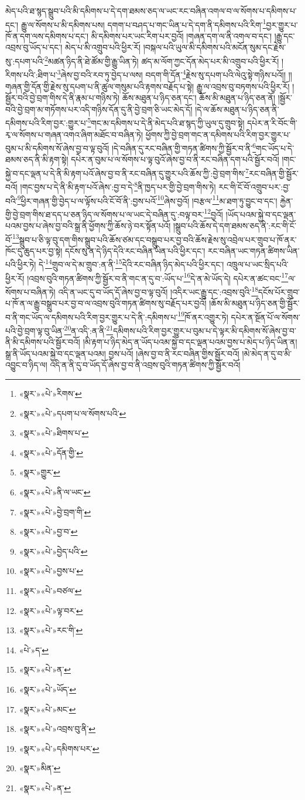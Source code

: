 མེད་པའི་ཐ་སྙད་སྒྲུབ་པའི་མི་དམིགས་པ་དེ་དག་ཐམས་ཅད་ལ་ཡང་རང་བཞིན་འགལ་བ་ལ་སོགས་པ་དམིགས་པ་དང་། རྒྱུ་ལ་སོགས་པ་མི་དམིགས་པས། དགག་པ་བཤད་པ་གང་ཡིན་པ་དེ་དག་ནི་དམིགས་པའི་རིག་\footnote{«སྣར་»«པེ་»རིགས་}བྱར་གྱུར་པ་ཁོ་ན་དག་ལས་དམིགས་པ་དང་། མི་དམིགས་པར་ཡང་རིག་པར་བྱའོ། །གཞན་དག་ལ་ནི་འགལ་བ་དང་། །རྒྱུ་དང་འབྲས་བུ་ཡོད་པ་དང་། མེད་པ་མི་འགྲུབ་པའི་ཕྱིར་རོ། །བསྐལ་པའི་ཡུལ་མི་དམིགས་པའི་མངོན་སུམ་དང་རྗེས་སུ་:དཔག་པའི་\footnote{«སྣར་»«པེ་»དཔག་པ་ལ་སོགས་པའི་}མཚན་ཉིད་ནི་ཐེ་ཚོམ་གྱི་རྒྱུ་ཡིན་ཏེ། ཚད་མ་ལོག་ཀྱང་དོན་མེད་པར་མི་འགྲུབ་པའི་ཕྱིར་རོ། །རིགས་པའི་:ཐིག་པ་\footnote{«སྣར་»«པེ་»ཐིགས་པ་}ཞེས་བྱ་བའི་རབ་ཏུ་བྱེད་པ་ལས། བདག་གི་དོན་\footnote{«སྣར་»«པེ་»དོན་གྱི་}རྗེས་སུ་དཔག་པའི་ལེའུ་སྟེ་གཉིས་པའོ།། །།གཞན་གྱི་དོན་གྱི་རྗེས་སུ་དཔག་པ་ནི་ཚུལ་གསུམ་པའི་རྟགས་བརྗོད་པ་སྟེ། རྒྱུ་ལ་འབྲས་བུ་བཏགས་པའི་ཕྱིར་རོ། །སྦྱོར་བའི་བྱེ་བྲག་གིས་དེ་ནི་རྣམ་པ་གཉིས་ཏེ། ཆོས་མཐུན་པ་ཉིད་ཅན་དང་། ཆོས་མི་མཐུན་པ་ཉིད་ཅན་ནོ། །སྦྱོར་བའི་བྱེ་བྲག་མ་གཏོགས་པར་འདི་གཉིས་དོན་དུ་ནི་བྱེ་བྲག་ཅི་ཡང་མེད་དོ། །དེ་ལ་ཆོས་མཐུན་པ་ཉིད་ཅན་ནི་དམིགས་པའི་རིག་བྱར་:གྱུར་པ་\footnote{«སྣར་»གྱུར་}གང་མ་དམིགས་པ་དེ་ནི་མེད་པའི་ཐ་སྙད་ཀྱི་ཡུལ་དུ་གྲུབ་སྟེ། དཔེར་ན་རི་བོང་གི་རྭ་ལ་སོགས་པ་གཞན་འགའ་ཞིག་མཐོང་བ་བཞིན་ཏེ། ཕྱོགས་ཀྱི་བྱེ་བྲག་གང་ན་དམིགས་པའི་རིག་བྱར་གྱུར་པ་བུམ་པ་མི་དམིགས་སོ་ཞེས་བྱ་བ་ལྟ་བུའོ། །དེ་བཞིན་དུ་རང་བཞིན་གྱི་གཏན་ཚིགས་ཀྱི་སྦྱོར་བ་ནི་\footnote{«སྣར་»«པེ་»ནི་ལ་ཡང་}གང་ཡོད་པ་དེ་ཐམས་ཅད་ནི་མི་རྟག་སྟེ། དཔེར་ན་བུམ་པ་ལ་སོགས་པ་ལྟ་བུའོ་ཞེས་བྱ་བ་ནི་རང་བཞིན་དག་པའི་སྦྱོར་བའོ། །གང་སྐྱེ་བ་དང་ལྡན་པ་དེ་ནི་མི་རྟག་པའོ་ཞེས་བྱ་བ་ནི་རང་བཞིན་དུ་གྱུར་པའི་ཆོས་ཀྱི་:བྱེ་བྲག་གིས་\footnote{«སྣར་»«པེ་»བྱེ་བྲག་གི་}རང་བཞིན་གྱི་སྦྱོར་བའོ། །གང་བྱས་པ་དེ་ནི་མི་རྟག་པའོ་ཞེས་:བྱ་བ་དེ་\footnote{«སྣར་»«པེ་»བྱ་བ་}ནི་ཁྱད་པར་གྱི་བྱེ་བྲག་གིས་ཏེ། རང་གི་ངོ་བོ་འགྲུབ་པར་:བྱ་བའི་\footnote{«སྣར་»«པེ་»བྱེད་པའི་}ཕྱིར་གཞན་གྱི་བྱེད་པ་ལ་ལྟོས་པའི་ངོ་བོ་ནི་:བྱས་པའོ་\footnote{«སྣར་»«པེ་»བྱས་པ་}ཞེས་བྱའོ། །བརྩལ་\footnote{«སྣར་»«པེ་»བཙལ་}མ་ཐག་ཏུ་བྱུང་བ་དང་། རྐྱེན་གྱི་བྱེ་བྲག་གིས་ཐ་དད་པ་ཅན་ཉིད་ལ་སོགས་པ་ལ་ཡང་དེ་བཞིན་དུ་:བལྟ་བར་\footnote{«སྣར་»«པེ་»ལྟ་བར་}བྱའོ། །ཡོད་པའམ་སྐྱེ་བ་དང་ལྡན་པའམ་བྱས་པ་ཞེས་བྱ་བའི་སྒྲ་ནི་ཕྱོགས་ཀྱི་ཆོས་ཉེ་བར་སྟོན་པའོ། །སྒྲུབ་པའི་ཆོས་དེ་དག་ཐམས་ཅད་ནི་:རང་གི་ངོ་བོ་\footnote{«སྣར་»«པེ་»རང་གི་}སྒྲུབ་པ་ཅི་ལྟ་བུ་དག་གིས་སྒྲུབ་པའི་ཆོས་ཙམ་དང་བསྒྲུབ་པར་བྱ་བའི་ཆོས་རྗེས་སུ་འབྲེལ་པར་གྲུབ་པ་ཁོ་ནར་ཁོང་དུ་ཆུད་པར་བྱ་སྟེ། དངོས་སུ་ན་དེ་ཉིད་དེའི་རང་བཞིན་ཡིན་པའི་ཕྱིར་དང་། རང་བཞིན་ཡང་གཏན་ཚིགས་ཡིན་པའི་ཕྱིར་ཏེ། དེ་\footnote{«པེ་»ད་}གྲུབ་ལ་དེ་མ་གྲུབ་:ན་ནི་\footnote{«སྣར་»«པེ་»ན་}དེའི་རང་བཞིན་ཉིད་མེད་པའི་ཕྱིར་དང་། འཁྲུལ་པ་ཡང་སྲིད་པའི་ཕྱིར་རོ། །འབྲས་བུའི་གཏན་ཚིགས་ཀྱི་སྦྱོར་བ་ནི་གང་ན་དུ་བ་:ཡོད་པ་\footnote{«སྣར་»«པེ་»ཡོད་}དེ་ན་མེ་ཡོད་དེ། དཔེར་ན་ཚང་བང་\footnote{«སྣར་»«པེ་»མང་}ལ་སོགས་པ་བཞིན་ཏེ། འདི་ན་ཡང་དུ་བ་ཡོད་དོ་ཞེས་བྱ་བ་ལྟ་བུའོ། །འདིར་ཡང་རྒྱུ་དང་:འབྲས་བུའི་\footnote{«སྣར་»«པེ་»འབྲས་བུ་ནི་}དངོས་པོར་གྲུབ་པ་ཁོ་ན་ལ་རྒྱུ་བསྒྲུབ་པར་བྱ་བ་ལ་འབྲས་བུའི་གཏན་ཚིགས་སུ་བརྗོད་པར་བྱའོ། །ཆོས་མི་མཐུན་པ་ཉིད་ཅན་གྱི་སྦྱོར་བ་ནི་གང་ཡོད་ལ་དམིགས་པའི་རིག་བྱར་གྱུར་པ་དེ་ནི་:དམིགས་པ་\footnote{«སྣར་»«པེ་»དམིགས་པར་}ཁོ་ནར་འགྱུར་ཏེ། དཔེར་ན་སྔོན་པོ་ལ་སོགས་པའི་བྱེ་བྲག་ལྟ་བུ་ཡིན་\footnote{«སྣར་»མིན་}ན་འདི་:ན་ནི་\footnote{«སྣར་»«པེ་»ན་}དམིགས་པའི་རིག་བྱར་གྱུར་པ་བུམ་པ་དེ་ལྟར་མི་དམིགས་སོ་ཞེས་བྱ་བ་ནི་མི་དམིགས་པའི་སྦྱོར་བའོ། །མི་རྟག་པ་ཉིད་མེད་ན་ཡོད་པའམ་སྐྱེ་བ་དང་ལྡན་པའམ་བྱས་པ་མེད་པ་ཉིད་ཡིན་ན། སྒྲ་ནི་ཡོད་པའམ་སྐྱེ་བ་དང་ལྡན་པའམ། བྱས་པའོ། །ཞེས་བྱ་བ་ནི་རང་བཞིན་གྱིས་སྦྱོར་བའོ། །མེ་མེད་ན་དུ་བ་མི་འབྱུང་བ་ཉིད་ལ། འདི་ན་ནི་དུ་བ་ཡོད་དོ་ཞེས་བྱ་བ་ནི་འབྲས་བུའི་གཏན་ཚིགས་ཀྱི་སྦྱོར་བའོ། 
